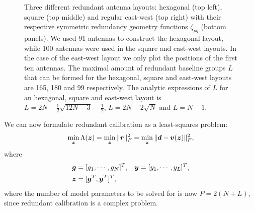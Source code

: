 \documentclass[useAMS,usenatbib]{mn2e}
\newcommand{\bz}{\bmath{z}}
\newcommand{\br}{\bmath{r}}
\newcommand{\bg}{\bmath{g}}
\newcommand{\bd}{\bmath{d}}
\newcommand{\bv}{\bmath{v}}
\newcommand{\by}{\bmath{y}}
\begin{document}
\begin{figure}
\caption{Three different redundant antenna layouts: hexagonal (top left), square (top middle) and regular east-west (top right) with their respective symmetric redundancy geometry functions $\zeta_{pq}$ (bottom panels). We used 91 antennas to construct the hexagonal layout, while 100 antennas were used in the square and east-west layouts. In the case of the east-west layout we only plot the positions of the first ten antennas. The maximal amount of redundant baseline groups $L$ that can be formed for 
the hexagonal, square and east-west layouts are 165, 180 and 99 respectively. The analytic expressions of $L$ for an hexagonal, square and east-west layout is $L = 2N-\frac{1}{2}\sqrt{12N-3}-\frac{1}{2}$,
$L=2N-2\sqrt{N}$ and $L=N-1$.\label{fig:geometry_function}}
\end{figure}

We can now formulate redundant calibration as a least-squares problem:
\begin{equation}
\label{eq:least_squares_red}
\min_{\bz} \Lambda(\bz) = \min_{\bz} \|\br\|_F^2 = \min_{\bz} \|\bd - \bv(\bz)\|_F^2, 
\end{equation}
where
\begin{align}
 \bg &=[g_1,\cdots,g_N]^T, & \by &= [y_1,\cdots,y_L]^T,\nonumber\\
 \bz &= [\bg^T,\by^T]^T, &  &\label{eq:parm_definitions}
 \end{align}
where the number of model parameters to be solved for is now $P = 2(N+L)$, since redundant calibration is a complex problem.
\end{document}
